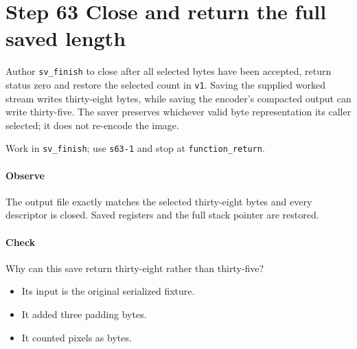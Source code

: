 \section{Step 63 Close and return the full saved length}\label{qoi-s63}
Author \texttt{sv\_finish} to close after all selected bytes have been accepted, return status zero and restore the selected count in \texttt{v1}. Saving the supplied worked stream writes thirty-eight bytes, while saving the encoder’s compacted output can write thirty-five. The saver preserves whichever valid byte representation its caller selected; it does not re-encode the image.

Work in \texttt{sv\_finish}; use \texttt{s63-1} and stop at \texttt{function\_return}.

\paragraph{Observe} The output file exactly matches the selected thirty-eight bytes and every descriptor is closed. Saved registers and the full stack pointer are restored.

\paragraph{Check} Why can this save return thirty-eight rather than thirty-five?
\begin{itemize}
  \item[A.] Its input is the original serialized fixture.
  \item[B.] It added three padding bytes.
  \item[C.] It counted pixels as bytes.
\end{itemize}

